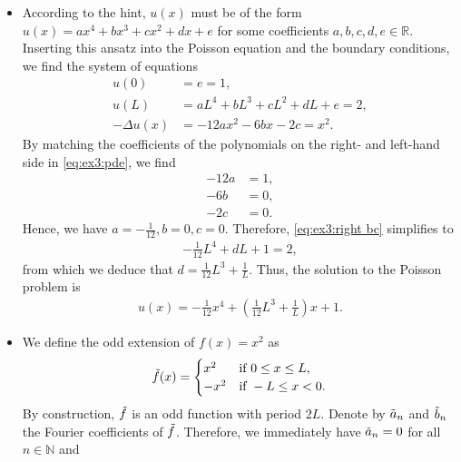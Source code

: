 \documentclass[11pt]{article}
\begin{document}
\begin{solution}  
    \begin{itemize}
        \item According to the hint, $u(x)$ must be of the form $u(x) = a x^4 + b x^3 + c x^2 + d x + e$ for some coefficients $a,b,c,d,e \in \mathbb R$.
        Inserting this ansatz into the Poisson equation and the boundary conditions, we find the system of equations
        \begin{align}
            u(0) &= e = 1, \label{eq:ex3:left bc}\\
            u(L) &= a L^4 + b L^3 + c L^2 + d L + e = 2, \label{eq:ex3:right bc}\\
            - \Delta u(x) &= - 12 a x^2 - 6 b x - 2 c = x^2. \label{eq:ex3:pde}
        \end{align}
        By matching the coefficients of the polynomials on the right- and left-hand side in \eqref{eq:ex3:pde}, we find
        \begin{align*}
            - 12 a &= 1,\\
            - 6 b &= 0,\\
            - 2 c &= 0.
        \end{align*}
        Hence, we have $a = -\frac{1}{12}, b = 0, c = 0$. Therefore, \eqref{eq:ex3:right bc} simplifies to
        \begin{align*}
            -\frac{1}{12} L^4 + dL + 1 = 2,
        \end{align*}
        from which we deduce that $d = \frac{1}{12} L^3 + \frac{1}{L}$. Thus, the solution to the Poisson problem is
        \begin{align*}
            u(x) = -\frac{1}{12} x^4 + \left(\frac{1}{12} L^3 + \frac{1}{L}\right) x + 1.
        \end{align*}
        \item We define the odd extension of $f(x) = x^2$ as
        \begin{align*}
            \Tilde{f}(x) = \begin{cases}
                x^2 & \text{if } 0 \leq x \leq L,\\
                -x^2 & \text{if } -L \leq x < 0.
            \end{cases}
        \end{align*}
        By construction, $\Tilde f$ is an odd function with period $2L$. Denote by $\Tilde{a}_n$ and $\Tilde{b}_n$ the Fourier coefficients of $\Tilde{f}$.
        Therefore, we immediately have $\Tilde{a}_n = 0$ for all $n \in \mathbb N$ and

\end{itemize}
\end{solution}
\end{document}
